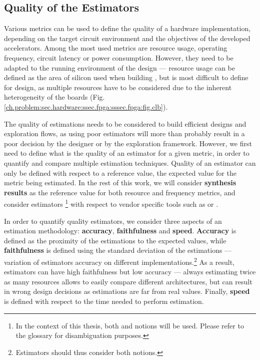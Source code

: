     \subsection{Quality of the Estimators}
    \label{ch.estimators:sec.estimators:ssec.quality}
        Various metrics can be used to define the quality of a hardware implementation, depending on the target circuit environment and the objectives of the developed accelerators.
        Among the most used metrics are resource usage, operating frequency, circuit latency or power consumption.
        However, they need to be adapted to the running environment of the design --- \eg resource usage can be defined as the area of silicon used when building , but is most difficult to define for  design, as multiple resources have to be considered due to the inherent heterogeneity of the boards (Fig. \ref{ch.problem:sec.hardware:ssec.fpga:sssec.fpga:fig.clb}).

        The quality of estimations needs to be considered to build efficient designs and exploration flows, as using poor estimators will more than probably result in a poor decision by the designer or by the exploration framework.
        However, we first need to define what is the quality of an estimator for a given metric, in order to quantify and compare multiple estimation techniques.
        Quality of an estimator can only be defined with respect to a reference value, \ie the expected value for the metric being estimated.
        In the rest of this work, we will consider {\bf synthesis results} as the reference value for both resource and frequency metrics, and consider estimators \footnote{In the context of this thesis, both  and  notions will be used. Please refer to the glossary for disambiguation purposes.} with respect to vendor specific tools such as  or .

        In order to quantify quality estimators, we consider three aspects of an estimation methodology: {\bf accuracy}, {\bf faithfulness} and {\bf speed}.
        {\bf Accuracy} is defined as the proximity of the estimations to the expected values, while {\bf faithfulness} is defined using the standard deviation of the estimations --- \ie variation of estimators accuracy on different implementations.\footnote{Estimators  should thus consider both notions.}
        As a result, estimators can have high faithfulness but low accuracy --- \eg always estimating twice as many resources allows to easily compare different architectures, but can result in wrong design decisions as estimations are far from real values.
        Finally, {\bf speed} is defined with respect to the time needed to perform estimation.

